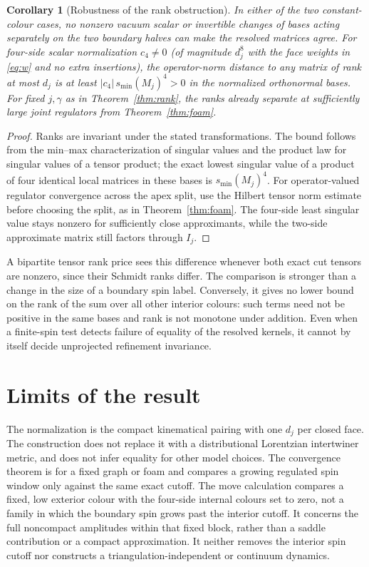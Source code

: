 \documentclass[11pt]{article}
\newtheorem{corollary}[theorem]{Corollary}
\theoremstyle{remark}
\begin{document}
\begin{corollary}[Robustness of the rank obstruction]\label{cor:robust}
In either of the two constant-colour cases, no nonzero vacuum scalar or invertible changes of bases acting separately on the two boundary halves can make the resolved matrices agree. For four-side scalar normalization \(c_4\ne0\) (of magnitude \(d_j^8\) with the face weights in \eqref{eq:w} and no extra insertions), the operator-norm distance to \emph{any} matrix of rank at most \(d_j\) is at least \(|c_4|\,s_{\min}(M_j)^4>0\) in the normalized orthonormal bases. For fixed \(j,\gamma\) as in Theorem~\ref{thm:rank}, the ranks already separate at sufficiently large joint regulators from Theorem~\ref{thm:foam}.
\end{corollary}
\begin{proof}
Ranks are invariant under the stated transformations. The bound follows from the min--max characterization of singular values and the product law for singular values of a tensor product; the exact lowest singular value of a product of four identical local matrices in these bases is \(s_{\min}(M_j)^4\). For operator-valued regulator convergence across the apex split, use the Hilbert tensor norm estimate before choosing the split, as in Theorem~\ref{thm:foam}. The four-side least singular value stays nonzero for sufficiently close approximants, while the two-side approximate matrix still factors through \(I_j\).
\end{proof}

A bipartite tensor rank price sees this difference whenever both exact cut tensors are nonzero, since their Schmidt ranks differ. The comparison is stronger than a change in the size of a boundary spin label. Conversely, it gives no lower bound on the rank of the sum over all other interior colours: such terms need not be positive in the same bases and rank is not monotone under addition. Even when a finite-spin test detects failure of equality of the resolved kernels, it cannot by itself decide unprojected refinement invariance.

\section{Limits of the result}

The normalization is the compact kinematical pairing with one \(d_j\) per closed face. The construction does not replace it with a distributional Lorentzian intertwiner metric, and does not infer equality for other model choices. The convergence theorem is for a fixed graph or foam and compares a growing regulated spin window only against the same exact cutoff. The move calculation compares a fixed, low exterior colour with the four-side internal colours set to zero, not a family in which the boundary spin grows past the interior cutoff. It concerns the full noncompact amplitudes within that fixed block, rather than a saddle contribution or a compact approximation. It neither removes the interior spin cutoff nor constructs a triangulation-independent or continuum dynamics.
\end{document}
